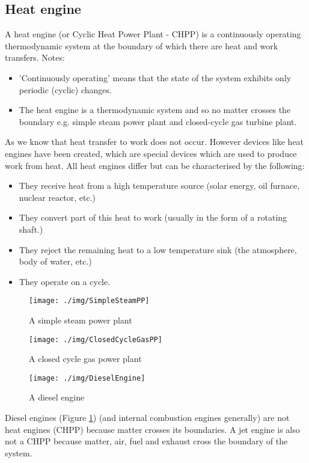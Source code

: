 \subsection{Heat engine}
A heat engine (or Cyclic Heat Power Plant - CHPP) is a continuously operating thermodynamic system at the boundary of which there are heat and work transfers.
Notes:
\begin{itemize}[noitemsep]
  \item 'Continuously operating' means that the state of the system exhibits only periodic (cyclic) changes.
  \item The heat engine is a thermodynamic system and so no matter crosses the boundary e.g. simple steam power plant and closed-cycle gas turbine plant.
\end{itemize}
As we know that heat transfer to work does not occur. However devices like heat engines have been created, which are special devices which are used to produce work from heat. All heat engines differ but can be characterised by the following:
\begin{itemize}[noitemsep]
  \item They receive heat from a high temperature source (solar energy, oil furnace, nuclear reactor, etc.)
  \item They convert part of this heat to work (usually in the form of a rotating shaft.)
  \item They reject the remaining heat to a low temperature sink (the atmosphere, body of water, etc.)
  \item They operate on a cycle.
\end{itemize}
\begin{figure}[H]
  \centering
  \texttt{[image: ./img/SimpleSteamPP]}
  \caption{A simple steam power plant}
\end{figure}
\begin{figure}[H]
  \centering
  \texttt{[image: ./img/ClosedCycleGasPP]}
  \caption{A closed cycle gas power plant}
\end{figure}
\begin{figure}[H]
  \centering
  \texttt{[image: ./img/DieselEngine]}
  \caption{A diesel engine}
  \label{dieselengine}
\end{figure}
Diesel engines (Figure \ref{dieselengine}) (and internal combustion engines generally) are not heat engines (CHPP) because matter crosses its boundaries. A jet engine is also not a CHPP because matter, air, fuel and exhaust cross the boundary of the system.
